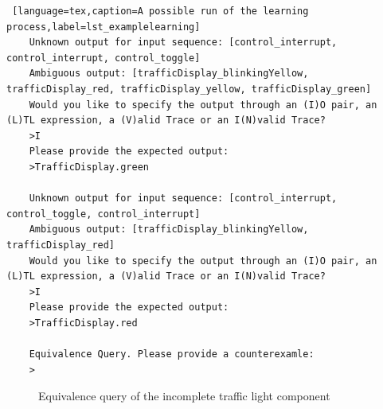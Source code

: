 \begin{lstlisting} [language=tex,caption=A possible run of the learning process,label=lst_examplelearning]
	Unknown output for input sequence: [control_interrupt, control_interrupt, control_toggle]
	Ambiguous output: [trafficDisplay_blinkingYellow, trafficDisplay_red, trafficDisplay_yellow, trafficDisplay_green]
	Would you like to specify the output through an (I)O pair, an (L)TL expression, a (V)alid Trace or an I(N)valid Trace?
	>I
	Please provide the expected output:
	>TrafficDisplay.green
	
	Unknown output for input sequence: [control_interrupt, control_toggle, control_interrupt]
	Ambiguous output: [trafficDisplay_blinkingYellow, trafficDisplay_red] 
	Would you like to specify the output through an (I)O pair, an (L)TL expression, a (V)alid Trace or an I(N)valid Trace?
	>I
	Please provide the expected output:
	>TrafficDisplay.red
	
	Equivalence Query. Please provide a counterexamle:
	>
\end{lstlisting}

\bigskip
\begin{figure}[!ht] 
	\centering
	\caption{Equivalence query of the incomplete traffic light component} 
	\label{fig_trafficlightincomplete}
\end{figure}